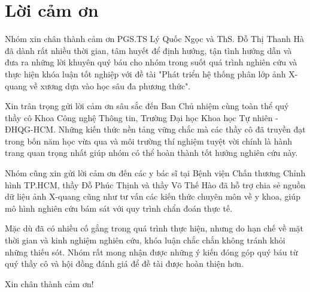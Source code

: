 \chapter*{Lời cảm ơn}
\label{thanks}

Nhóm xin chân thành cảm ơn PGS.TS Lý Quốc Ngọc và ThS. Đỗ Thị Thanh Hà đã dành rất nhiều thời gian, tâm huyết để định hướng, tận tình hướng dẫn và đưa ra những lời khuyên quý báu cho nhóm trong suốt quá trình nghiên cứu và thực hiện khóa luận tốt nghiệp với đề tài "Phát triển hệ thống phân lớp ảnh X-quang về xương dựa vào học sâu đa phương thức".

Xin trân trọng gửi lời cảm ơn sâu sắc đến Ban Chủ nhiệm cùng toàn thể quý thầy cô Khoa Công nghệ Thông tin, Trường Đại học Khoa học Tự nhiên - ĐHQG-HCM. Những kiến thức nền tảng vững chắc mà các thầy cô đã truyền đạt trong bốn năm học vừa qua và môi trường thí nghiệm tuyệt vời chính là hành trang quan trọng nhất giúp nhóm có thể hoàn thành tốt hướng nghiên cứu này.

Nhóm cũng xin gửi lời cảm ơn đến các y bác sĩ tại Bệnh viện Chấn thương Chỉnh hình TP.HCM, thầy Đỗ Phúc Thịnh và thầy Võ Thế Hào đã hỗ trợ chia sẻ nguồn dữ liệu ảnh X-quang cũng như tư vấn các kiến thức chuyên môn về y khoa, giúp mô hình nghiên cứu bám sát với quy trình chẩn đoán thực tế.

Mặc dù đã có nhiều cố gắng trong quá trình thực hiện, nhưng do hạn chế về mặt thời gian và kinh nghiệm nghiên cứu, khóa luận chắc chắn không tránh khỏi những thiếu sót. Nhóm rất mong nhận được những ý kiến đóng góp quý báu từ quý thầy cô và hội đồng đánh giá để đề tài được hoàn thiện hơn.

Xin chân thành cảm ơn!
